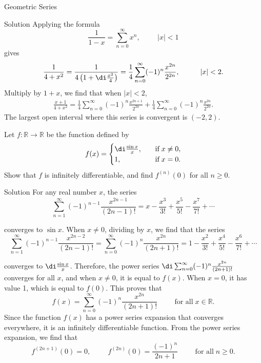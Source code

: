 \begin{example}[label=230305_16]{Geometric Series}
\begin{example}[label=230304_9]{}
\begin{example}{}
\begin{example}{}
\end{example}
\begin{solution}{Solution}
Applying the formula
\[\frac{1}{1-x}=\sum_{n=0}^{\infty}x^n,\hspace{1cm}|x|<1 \]
gives
\begin{align*}
\frac{1}{4+x^2}= \frac{1}{4\left(1+\di\frac{x^2}{4}\right)}=\frac{1}{4}\sum_{n=0}^{\infty}(-1)^n\frac{x^{2n}}{2^{2n}},\hspace{1cm}|x|<2.
\end{align*}Multiply by $1+x$, we find that when $|x|<2$, 
\begin{align*}
\frac{x+1}{4+x^2}=\frac{1}{4}\sum_{n=0}^{\infty}(-1)^n\frac{x^{2n+1}}{2^{2n}}+\frac{1}{4}\sum_{n=0}^{\infty}(-1)^n\frac{x^{2n}}{2^{2n}}.
\end{align*} The largest open interval where this series is convergent is $(-2,2)$.
\end{solution}



\begin{example}{}
Let $f:\mathbb{R}\to\mathbb{R}$ be the function defined by
\[f(x)=\begin{cases} \di\frac{\sin x}{x},\quad &\text{if}\;x\neq 0,\\1,\quad & \text{if} \;x=0.\end{cases}\]Show that  $f$ is infinitely differentiable, and find $f^{(n)}(0) $ for all $n\geq 0$.
\end{example}
\begin{solution}{Solution}
For any real number $x$, the series
\[\sum_{n=1}^{\infty}(-1)^{n-1}\frac{x^{2n-1}}{(2n-1)!}=x-\frac{x^3}{3!}+\frac{x^5}{5!}-\frac{x^7}{7!}+\cdots\] 

converges to $\sin x$. When $x\neq 0$, dividing by $x$, we find that the series 
\[\sum_{n=1}^{\infty}(-1)^{n-1}\frac{x^{2n-2}}{(2n-1)!}=\sum_{n=0}^{\infty}(-1)^n\frac{x^{2n}}{(2n+1)!}=1-\frac{x^2}{3!}+\frac{x^4}{5!}-\frac{x^6}{7!}+\cdots\]

 converges to $\di \frac{\sin x}{x}$.  Therefore, the power series 
$\di \sum_{n=0}^{\infty}(-1)^n\frac{x^{2n}}{(2n+1)!}$ converges for all $x$, and when $x\neq 0$, it is equal to $f(x)$. When $x=0$, it has value 1, which is equal to $f(0)$. This proves that 
\[f(x)=\sum_{n=0}^{\infty}(-1)^n\frac{x^{2n}}{(2n+1)!}\hspace{1cm}\text{for all}\;x\in\mathbb{R}.\]
Since the function $f(x)$ has a power series expansion that converges everywhere, it is an infinitely differentiable function. From the power series expansion, we find that
\[f^{(2n+1)}(0)=0,\hspace{1cm}f^{(2n)}(0)=\frac{(-1)^n}{2n+1}\hspace{1cm}\text{for all}\;n\geq 0.\]
\end{solution}


\end{example}
\end{example}
\end{example}
